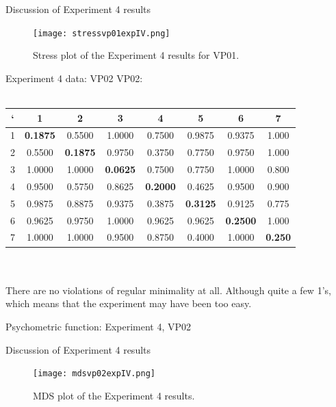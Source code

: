 \documentclass{beamer}
\begin{document}
\begin{frame}[t]{Discussion of Experiment 4 results}
\begin{figure}[c]
\texttt{[image: stressvp01expIV.png]}
\caption{Stress plot of the Experiment 4 results for VP01.}
\end{figure}
\end{frame}

\begin{frame}[t]{Experiment 4 data: VP02}
VP02:\\
~\\
\begin{tabular}{c | c c c c c c c}
` & 1 & 2 & 3 & 4 & 5 & 6 & 7 \\ \hline

1 & {\bf \color{red} 0.1875} & 0.5500 & 1.0000 & 0.7500 & 0.9875 & 0.9375 & 1.000 \\
2 & 0.5500& {\bf \color{red} 0.1875}& 0.9750& 0.3750& 0.7750& 0.9750& 1.000\\
3 & 1.0000& 1.0000& {\bf \color{red} 0.0625}& 0.7500& 0.7750& 1.0000& 0.800\\
4 & 0.9500& 0.5750& 0.8625& {\bf \color{red} 0.2000}& 0.4625& 0.9500& 0.900\\
5 & 0.9875& 0.8875& 0.9375& 0.3875& {\bf \color{red} 0.3125}& 0.9125& 0.775\\
6 & 0.9625& 0.9750& 1.0000& 0.9625& 0.9625& {\bf \color{red} 0.2500}& 1.000\\
7 & 1.0000& 1.0000& 0.9500& 0.8750& 0.4000& 1.0000& {\bf \color{red} 0.250}\\

\end{tabular}
\\
~\\
There are no violations of regular minimality at all. Although quite a few 1's, which means that the experiment may have been too easy.
\end{frame}





\begin{frame}[t]{Psychometric function: Experiment 4, VP02}
\end{frame}

\begin{frame}[t]{Discussion of Experiment 4 results}
\begin{figure}[c]
\texttt{[image: mdsvp02expIV.png]}
\caption{MDS plot of the Experiment 4 results.}
\end{figure}
\end{frame}
\end{document}
